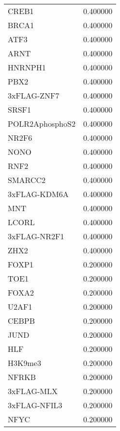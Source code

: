 \begin{longtable}{lr}
           CREB1 &  0.400000 \\
           BRCA1 &  0.400000 \\
            ATF3 &  0.400000 \\
            ARNT &  0.400000 \\
         HNRNPH1 &  0.400000 \\
            PBX2 &  0.400000 \\
     3xFLAG-ZNF7 &  0.400000 \\
           SRSF1 &  0.400000 \\
 POLR2AphosphoS2 &  0.400000 \\
           NR2F6 &  0.400000 \\
            NONO &  0.400000 \\
            RNF2 &  0.400000 \\
         SMARCC2 &  0.400000 \\
    3xFLAG-KDM6A &  0.400000 \\
             MNT &  0.400000 \\
           LCORL &  0.400000 \\
    3xFLAG-NR2F1 &  0.400000 \\
            ZHX2 &  0.400000 \\
           FOXP1 &  0.200000 \\
            TOE1 &  0.200000 \\
           FOXA2 &  0.200000 \\
           U2AF1 &  0.200000 \\
           CEBPB &  0.200000 \\
            JUND &  0.200000 \\
             HLF &  0.200000 \\
         H3K9me3 &  0.200000 \\
           NFRKB &  0.200000 \\
      3xFLAG-MLX &  0.200000 \\
    3xFLAG-NFIL3 &  0.200000 \\
            NFYC &  0.200000 \\
\end{longtable}
